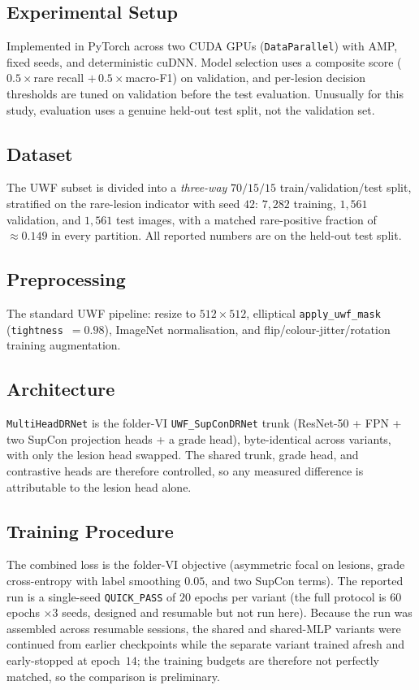 \documentclass[journal,twoside,web]{ieeecolor}
\begin{document}
\subsection{Experimental Setup}
Implemented in PyTorch across two CUDA GPUs (\texttt{DataParallel}) with AMP, fixed
seeds, and deterministic cuDNN. Model selection uses a composite score
($0.5\times$rare recall $+\,0.5\times$macro-F1) on validation, and per-lesion
decision thresholds are tuned on validation before the test evaluation. Unusually
for this study, evaluation uses a genuine held-out test split, not the validation
set.

\subsection{Dataset}
The UWF subset is divided into a \emph{three-way} $70/15/15$ train/validation/test
split, stratified on the rare-lesion indicator with seed $42$: $7{,}282$ training,
$1{,}561$ validation, and $1{,}561$ test images, with a matched rare-positive
fraction of $\approx0.149$ in every partition. All reported numbers are on the
held-out test split.

\subsection{Preprocessing}
The standard UWF pipeline: resize to $512\times512$, elliptical
\texttt{apply\_uwf\_mask} (\texttt{tightness}~$=0.98$), ImageNet normalisation, and
flip/colour-jitter/rotation training augmentation.

\subsection{Architecture}
\texttt{MultiHeadDRNet} is the folder-VI \texttt{UWF\_SupConDRNet} trunk (ResNet-50 +
FPN + two SupCon projection heads + a grade head), byte-identical across variants,
with only the lesion head swapped. The shared trunk, grade head, and contrastive
heads are therefore controlled, so any measured difference is attributable to the
lesion head alone.

\subsection{Training Procedure}
The combined loss is the folder-VI objective (asymmetric focal on lesions, grade
cross-entropy with label smoothing $0.05$, and two SupCon terms). The reported run
is a single-seed \texttt{QUICK\_PASS} of $20$ epochs per variant (the full protocol
is $60$ epochs $\times 3$ seeds, designed and resumable but not run here). Because
the run was assembled across resumable sessions, the shared and shared-MLP variants
were continued from earlier checkpoints while the separate variant trained afresh
and early-stopped at epoch~$14$; the training budgets are therefore not perfectly
matched, so the comparison is preliminary.
\end{document}
